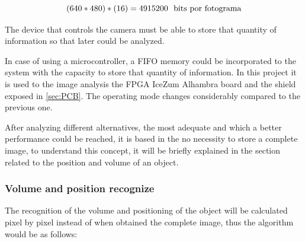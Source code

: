 \begin{equation}\label{eq:pixeles}
	(640*480)*(16) = 4915200  \ \ \textup{bits por fotograma} 
\end{equation}

The device that controls the camera must be able to store that quantity of information so that later could be analyzed. \newline

In case of using a microcontroller, a FIFO memory could be incorporated to the system with the capacity to store that quantity of information. In this project it is used to the image analysis the FPGA IceZum Alhambra board and the shield exposed in \ref{sec:PCB}. The operating mode changes considerably compared to the previous one. \newline

After analyzing different alternatives, the most adequate and which a better performance could be reached, it is based in the no necessity to store a complete image, to understand this concept, it will be briefly explained in the section related to the position and volume of an object.

\subsubsection{Volume and position recognize}\label{sec:volumen}

The recognition of the volume and positioning of the object will be calculated pixel by pixel instead of when obtained the complete image, thus the algorithm would be as follows:

